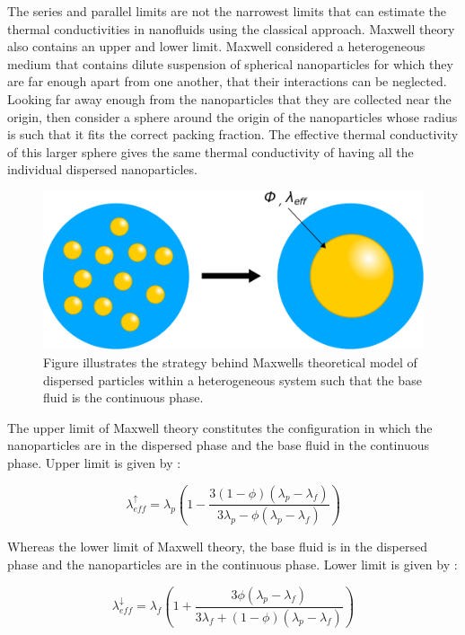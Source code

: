 \documentclass[12pt,MEng]{UoAThesis}
\begin{document}
The series and parallel limits are not the narrowest limits that can estimate the thermal conductivities in nanofluids using the classical approach. Maxwell theory also contains an upper and lower limit. Maxwell considered a heterogeneous medium that contains dilute suspension of spherical nanoparticles for which they are far enough apart from one another, that their interactions can be neglected. Looking far away enough from the nanoparticles that they are collected near the origin, then consider a sphere around the origin of the nanoparticles whose radius is such that it fits the correct packing fraction. The effective thermal conductivity of this larger sphere gives the same thermal conductivity of having all the individual dispersed nanoparticles.


\begin{figure}[htp]
  \centering
  \includegraphics[clip,width=0.6\linewidth]{figures/maxwell}
  \caption{\label{fig:maxwell} Figure illustrates the strategy behind Maxwells theoretical model of dispersed particles within a heterogeneous system such that the base fluid is the continuous phase.}
\end{figure}

\noindent The upper limit of Maxwell theory constitutes the configuration in which the nanoparticles are in the dispersed phase and the base fluid in the continuous phase. Upper limit is given by \cite{class2010}:

\begin{equation}
\lambda^{\uparrow}_{eff} = \lambda_p \left( 1 - \frac{3(1 - \phi)(\lambda_p - \lambda_f)}{3 \lambda_p - \phi(\lambda_p - \lambda_f)} \right)
\end{equation}

\noindent Whereas the lower limit of Maxwell theory, the base fluid is in the dispersed phase and the nanoparticles are in the continuous phase. Lower limit is given by \cite{class2010}:

\begin{equation}
\lambda^{\downarrow}_{eff} = \lambda_f \left( 1 + \frac{3 \phi (\lambda_p - \lambda_f)}{3 \lambda_f + (1 - \phi)(\lambda_p - \lambda_f)} \right)
\end{equation}
\end{document}
